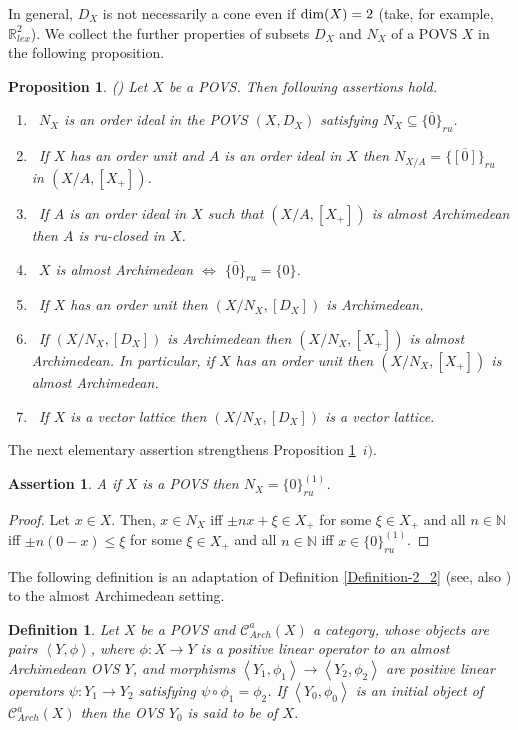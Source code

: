 \documentclass[10pt]{article}
\newtheorem{proposition}{Proposition}[section]
\newtheorem{assertion}{Assertion}[section]
\newtheorem{definition}{Definition}[section]
\begin{document}
\noindent
In general, $D_X$ is not necessarily a cone even if $\text{\rm dim}(X)=2$ (take, for example, $\mathbb{R}^2_{lex}$). 
We collect the further properties of subsets $D_X$ and $N_X$ of a POVS $X$ in the following proposition.

\begin{proposition}\label{Proposition-3_2}
{\rm (\cite[Propositions 3.1 and 3.2]{E-2017})}
Let $X$ be a POVS. Then following assertions hold.
\begin{enumerate}[$i)$]
\item\
$N_X$ is an order ideal in the POVS $(X,D_X)$ satisfying $N_X\subseteq\overline{\{0\}}_{ru}$.
\item\
If $X$ has an order unit and $A$ is an order ideal in $X$ then $N_{X/A}=\overline{\{[0]\}}_{ru}$ in $(X/A,[X_+])$.
\item\
If $A$ is an order ideal in $X$ such that $(X/A,[X_+])$ is almost Archimedean then $A$ is ru-closed in $X$.
\item\
$X$ is almost Archimedean  $\iff$ $\overline{\{0\}}_{ru}=\{0\}$.
\item\
If $X$ has an order unit then $(X/N_X,[D_X])$ is Archimedean.
\item\
If $(X/N_X,[D_X])$ is Archi\-me\-dean then $(X/N_X,[X_+])$ is almost Archi\-me\-dean. In particular,
if $X$ has an order unit then $(X/N_X,[X_+])$ is almost Archimedean.
\item\
If $X$ is a vector lattice then $(X/N_X,[D_X])$ is a vector lattice.
\end{enumerate}
\end{proposition}

The next elementary assertion strengthens Proposition \ref{Proposition-3_2}~$i)$.

\begin{assertion}\label{Assertion-3_1}
A if $X$ is a POVS then $N_X=\{0\}^{(1)}_{ru}$.
\end{assertion}

\begin{proof}
Let $x\in X$. Then, $x\in N_X$ iff $\pm nx+\xi\in X_+$ for some $\xi\in X_+$ and all $n\in\mathbb{N}$ iff
$\pm n(0-x)\leqslant\xi$ for some $\xi\in X_+$ and all $n\in\mathbb{N}$ iff $x\in\{0\}^{(1)}_{ru}$.
\end{proof}

\medskip
The following definition is an adaptation of Definition \ref{Definition-2_2} (see, also \cite[Definition 5]{E-2017}) to the almost Archimedean setting.

\begin{definition}\label{Definition-3_1}
Let $X$ be a POVS and $\mathcal{C}^a_{Arch}(X)$ a category, whose objects are pairs $\left\langle Y,\phi\right\rangle$,
where $\phi:X\to Y$ is a positive linear operator to an almost Archimedean OVS $Y$, and morphisms
$\left\langle Y_1,\phi_1\right\rangle\to\left\langle Y_2,\phi_2\right\rangle$ are positive linear operators $\psi: Y_1\to Y_2$ satisfying
$\psi\circ\phi_1=\phi_2$. If $\left\langle Y_0,\phi_0\right\rangle$ is an initial object of $\mathcal{C}^a_{Arch}(X)$ 
then the OVS $Y_0$ is said to be {\color{blue}{almost Archimedeanization}} of $X$.
\end{definition}
\end{document}
